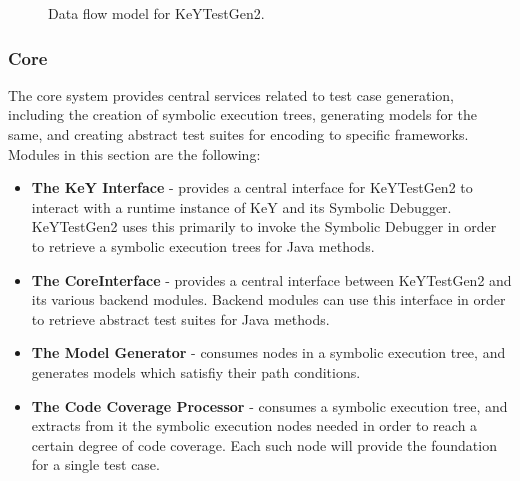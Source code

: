 \documentclass{article}
\newcommand{\tmstrong}[1]{\textbf{#1}}
\newenvironment{itemizedot}{\begin{itemize} \renewcommand{\labelitemi}{$\bullet$}\renewcommand{\labelitemii}{$\bullet$}\renewcommand{\labelitemiii}{$\bullet$}\renewcommand{\labelitemiv}{$\bullet$}}{\end{itemize}}
\begin{document}
\begin{figure}[h]
  \caption{Data flow model for KeYTestGen2.}
\end{figure}



\subsubsection{Core}

The core system provides central services related to test case generation,
including the creation of symbolic execution trees, generating models for the
same, and creating abstract test suites for encoding to specific frameworks.
Modules in this section are the following:
\begin{itemizedot}
  \item {\tmstrong{The KeY Interface}} - provides a central interface for
  KeYTestGen2 to interact with a runtime instance of KeY and its Symbolic
  Debugger. KeYTestGen2 uses this primarily to invoke the Symbolic Debugger in
  order to retrieve a symbolic execution trees for Java methods.
  
  \item {\tmstrong{The CoreInterface}} - provides a central interface between
  KeYTestGen2 and its various backend modules. Backend modules can use this
  interface in order to retrieve abstract test suites for Java methods.
  
  \item {\tmstrong{The Model Generator}} - consumes nodes in a symbolic
  execution tree, and generates models which satisfiy their path conditions.
  
  \item {\tmstrong{The Code Coverage Processor}} - consumes a symbolic
  execution tree, and extracts from it the symbolic execution nodes needed in
  order to reach a certain degree of code coverage. Each such node will
  provide the foundation for a single test case.
\end{itemizedot}
\end{document}

